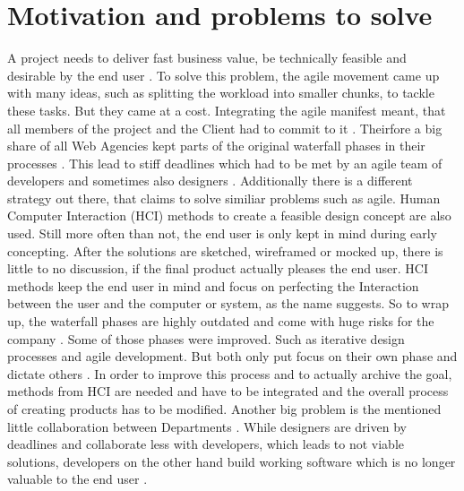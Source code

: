 \section*{Motivation and problems to solve}

A project needs to deliver fast business value, be technically feasible and desirable by the end user \citep{ratcliffe2011agile:11}. \newline
To solve this problem, the agile movement came up with many ideas, such as splitting the workload into smaller chunks, to tackle these tasks. But they came at a cost. Integrating the agile manifest meant, that all members of the project and the Client had to commit to it \citep{ratcliffe2011agile:11}. Theirfore a big share of all Web Agencies kept parts of the original waterfall phases in their processes \citep{10spanne26:online}. This lead to stiff deadlines which had to be met by an agile team of developers and sometimes also designers \citep{ratcliffe2011agile:4}. \newline
Additionally there is a different strategy out there, that claims to solve similiar problems such as agile. Human Computer Interaction (HCI) methods to create a feasible design concept are also used. \newline
Still more often than not, the end user is only kept in mind during early concepting. After the solutions are sketched, wireframed or mocked up, there is little to no discussion, if the final product actually pleases the end user. HCI methods keep the end user in mind and focus on perfecting the Interaction between the user and the computer or system, as the name suggests. \newline
So to wrap up, the waterfall phases are highly outdated and come with huge risks for the company \citep{ratcliffe2011agile:14}. Some of those phases were improved. Such as iterative design processes and agile development. But both only put focus on their own phase and dictate others \citep{ratcliffe2011agile:22}. In order to improve this process and to actually archive the goal, methods from HCI are needed and have to be integrated and the overall process of creating products has to be modified. \newline
Another big problem is the mentioned little collaboration between Departments \citep{ratcliffe2011agile:fw}. While designers are driven by deadlines and collaborate less with developers, which leads to not viable solutions, developers on the other hand build working software which is no longer valuable to the end user \citep{ratcliffe2011agile:19,ratcliffe2011agile:33}. \newline

